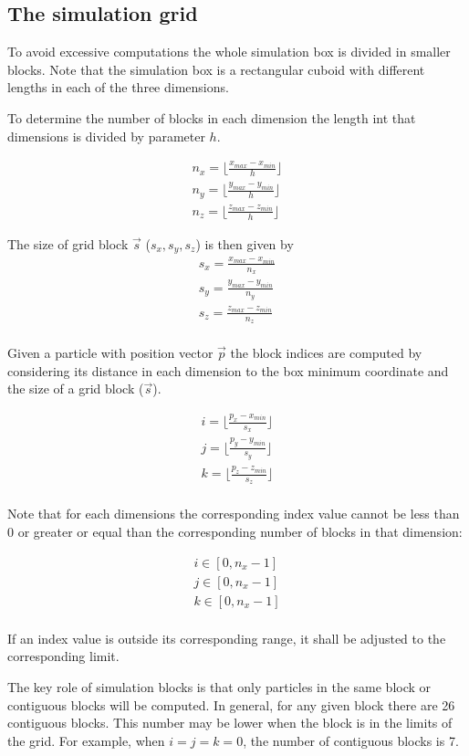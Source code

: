\subsection{The simulation grid}

To avoid excessive computations the whole simulation box is divided in smaller
blocks. Note that the simulation box is a rectangular cuboid with different
lengths in each of the three dimensions. 

To determine the number of blocks in each dimension the length int that
dimensions is divided by parameter $h$.

\[
\begin{split}
n_x = \lfloor \frac{x_{max}- x_{min}}{h} \rfloor\\
n_y = \lfloor \frac{y_{max}- y_{min}}{h} \rfloor\\
n_z = \lfloor \frac{z_{max}- z_{min}}{h} \rfloor
\end{split}
\]

The size of grid block $\vec{s}$ ($s_x, s_y, s_z$) is then given by
\[
\begin{split}
s_x = \frac{x_{max} - x_{min}}{n_x}\\
s_y = \frac{y_{max} - y_{min}}{n_y}\\
s_z = \frac{z_{max} - z_{min}}{n_z}\\
\end{split}
\] 

Given a particle with position vector $\vec{p}$ the block indices are computed
by considering its distance in each dimension to the box minimum coordinate
and the size of a grid block ($\vec{s}$).

\[
\begin{split}
i = \lfloor \frac{p_x - x_{min}}{s_x} \rfloor\\
j = \lfloor \frac{p_y - y_{min}}{s_y} \rfloor\\
k = \lfloor \frac{p_z - z_{min}}{s_z} \rfloor\\
\end{split}
\]

Note that for each dimensions the corresponding index value cannot be less than
$0$ or greater or equal than the corresponding number of blocks in that
dimension:

\[
\begin{split}
i \in [0, n_x-1]\\
j \in [0, n_x-1]\\
k \in [0, n_x-1]\\
\end{split}
\]

If an index value is outside its corresponding range, it shall be adjusted to
the corresponding limit.

The key role of simulation blocks is that only particles in the same block or
contiguous blocks will be computed. In general, for any given block there are
26 contiguous blocks. This number may be lower when the block is in the limits
of the grid. For example, when $i=j=k=0$, the number of contiguous blocks is 7.
